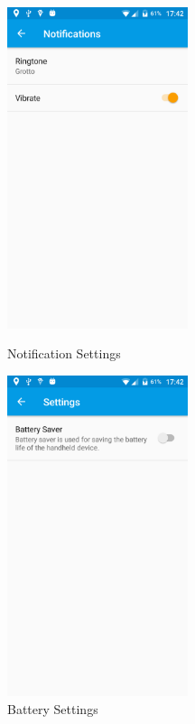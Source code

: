 \begin{figure}[!tbp]
	\centering
	\begin{minipage}[b]{0.4\textwidth}
		\includegraphics[width=150pt]{Notification-Settings}
		\caption{Notification Settings}
		\label{Figure: Notification Settings}
	\end{minipage}
	\hfill
	\begin{minipage}[b]{0.4\textwidth}
		\includegraphics[width=150pt]{Battery-Settings}
		\caption{Battery Settings} 
		\label{Figure: Battery Settings}
	\end{minipage}
\end{figure}
